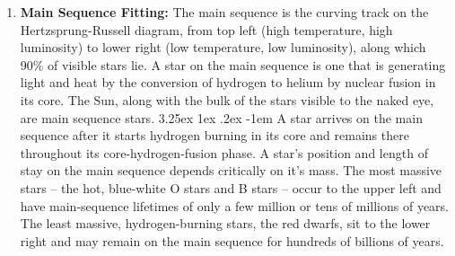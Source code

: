 \documentclass[a4paper,twoside,11pt]{article}
\makeatletter
\numberwithin{equation}{section}
\renewcommand\paragraph{\@startsection{paragraph}{5}{\z@}%
  {3.25ex \@plus1ex \@minus.2ex}%
  {-1em}%
  {\normalfont\normalsize\bfseries}}
\makeatother
\begin{document}
\begin{enumerate}
    \item \textbf{Main Sequence Fitting:}  The main sequence is the curving track on the Hertzsprung-Russell diagram, from top left (high temperature, high luminosity) to lower right (low temperature, low luminosity), along which 90\% of visible stars lie. A star on the main sequence is one that is generating light and heat by the conversion of hydrogen to helium by nuclear fusion in its core. The Sun, along with the bulk of the stars visible to the naked eye, are main sequence stars.
    \paragraph{}
    A star arrives on the main sequence after it starts hydrogen burning in its core and remains there throughout its core-hydrogen-fusion phase. A star's position and length of stay on the main sequence depends critically on it's mass. The most massive stars – the hot, blue-white O stars and B stars – occur to the upper left and have main-sequence lifetimes of only a few million or tens of millions of years. The least massive, hydrogen-burning stars, the red dwarfs, sit to the lower right and may remain on the main sequence for hundreds of billions of years. \cite{DistLadder2}

\end{enumerate}
\end{document}
